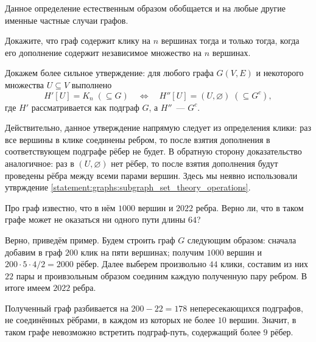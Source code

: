 Данное определение естественным образом обобщается и на любые другие именные частные случаи графов.


\begin{Exercise}[counter=SecExercise]
    \noindent
    Докажите, что граф содержит клику на $ n $ вершинах тогда и только тогда,
    когда его дополнение содержит независимое множество на $ n $ вершинах.
\end{Exercise}

\begin{Answer}
    \noindent
    Докажем более сильное утверждение:
    для любого графа $ G(V, E) $ и некоторого множества $ U \subseteq V $ выполнено
    \[
        H'[U] = K_n \; (\subseteq G) \quad \Longleftrightarrow \quad H''[U] = (U, \varnothing) \; (\subseteq G^c),
    \]
    где $ H' $ рассматривается как подграф $ G $, а $ H'' $~--- $ G^c $.

    Действительно, данное утверждение напрямую следует из определения клики:
    раз все вершины в клике соединены ребром, то после взятия дополнения в соответствующем подграфе рёбер не будет.
    В обратную сторону доказательство аналогичное: раз в $ (U, \varnothing) $ нет рёбер,
    то после взятия дополнения будут проведены рёбра между всеми парами вершин.
    Здесь мы неявно использовали утврждение \ref{statement:graphs:subgraph_set_theory_operations}.
\end{Answer}


\begin{Exercise}[counter=SecExercise, label=exercise:graphs:disjoined]
    \noindent
    Про граф известно, что в нём $ 1000 $ вершин и $ 2022 $ ребра.
    Верно ли, что в таком графе может не оказаться ни одного пути длины $ 64 $?
\end{Exercise}

\begin{Answer}
    \noindent
    Верно, приведём пример.
    Будем строить граф $ G $ следующим образом:
    сначала добавим в граф $ 200 $ клик на пяти вершинах;
    получим $ 1000 $ вершин и $ 200 \cdot 5 \cdot 4 / 2 = 2000 $ рёбер.
    Далее выберем произвольно $ 44 $ клики, составим из них $ 22 $ пары
    и проивзольным образом соединим каждую полученную пару ребром.
    В итоге имеем $ 2022 $ ребра.

    Полученный граф разбивается на $ 200 - 22 = 178 $ непересекающихся подграфов,
    не соединённых рёбрами, в каждом из которых не более $ 10 $ вершин.
    Значит, в таком графе невозможно встретить подграф-путь,
    содержащий более $ 9 $ рёбер.
\end{Answer}


